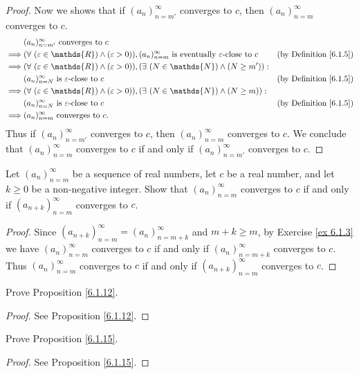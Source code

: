 \begin{proof}
Now we shows that if \((a_n)_{n = m'}^\infty\) converges to \(c\), then \((a_n)_{n = m}^\infty\) converges to \(c\).
\begin{align*}
& (a_n)_{n = m'}^\infty \text{ converges to } c \\
\implies & (\forall\ (\varepsilon \in \mathds{R}) \land (\varepsilon > 0)), (a_n)_{n = m}^\infty \text{ is eventually } \varepsilon\text{-close to } c & \text{(by Definition \ref{6.1.5})} \\
\implies & (\forall\ (\varepsilon \in \mathds{R}) \land (\varepsilon > 0)), (\exists\ (N \in \mathds{N}) \land (N \geq m')) : \\
& (a_n)_{n = N}^\infty \text{ is } \varepsilon\text{-close to } c & \text{(by Definition \ref{6.1.5})} \\
\implies & (\forall\ (\varepsilon \in \mathds{R}) \land (\varepsilon > 0)), (\exists\ (N \in \mathds{N}) \land (N \geq m)) : \\
& (a_n)_{n = N}^\infty \text{ is } \varepsilon\text{-close to } c & \text{(by Definition \ref{6.1.5})} \\
\implies & (a_n)_{n = m}^\infty \text{ converges to } c.
\end{align*}
Thus if \((a_n)_{n = m'}^\infty\) converges to \(c\), then \((a_n)_{n = m}^\infty\) converges to \(c\).
We conclude that \((a_n)_{n = m}^\infty\) converges to \(c\) if and only if \((a_n)_{n = m'}^\infty\) converges to \(c\).
\end{proof}

\begin{exercise}\label{ex 6.1.4}
Let \((a_n)_{n = m}^\infty\) be a sequence of real numbers, let \(c\) be a real number, and let \(k \geq 0\) be a non-negative integer.
Show that \((a_n)_{n = m}^\infty\) converges to \(c\) if and only if \((a_{n + k})_{n = m}^\infty\) converges to \(c\).
\end{exercise}

\begin{proof}
Since \((a_{n + k})_{n = m}^\infty = (a_n)_{n = m + k}^\infty\) and \(m + k \geq m\), by Exercise \ref{ex 6.1.3} we have \((a_n)_{n = m}^\infty\) converges to \(c\) if and only if \((a_n)_{n = m + k}^\infty\) converges to \(c\).
Thus \((a_n)_{n = m}^\infty\) converges to \(c\) if and only if \((a_{n + k})_{n = m}^\infty\) converges to \(c\).
\end{proof}

\begin{exercise}\label{ex 6.1.5}
Prove Proposition \ref{6.1.12}.
\end{exercise}

\begin{proof}
See Proposition \ref{6.1.12}.
\end{proof}

\begin{exercise}\label{ex 6.1.6}
Prove Proposition \ref{6.1.15}.
\end{exercise}

\begin{proof}
See Proposition \ref{6.1.15}.
\end{proof}